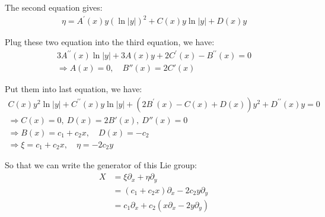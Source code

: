 \documentclass[]{ctexart}
\newcommand{\pa}{\partial}
\begin{document}
	The second equation gives:
		\begin{equation*}
		\begin{aligned}
			\eta=A^{\prime}(x) y(\ln |y|)^{2}+C(x) y \ln |y|+D(x) y
		\end{aligned}
		\end{equation*}
		
	Plug these two equation into the third equation, we have:
		\begin{equation*}
		\begin{array}{c}
			3 A^{\prime \prime}(x) \ln |y|+3 A(x) y+2 C^{\prime}(x)-B^{\prime \prime}(x)=0\\
			\Rightarrow	A(x)=0,\quad B''(x)=2C'(x)
		\end{array}
		\end{equation*}
		
	Put them into last equation, we have:
		\begin{equation*}
		\begin{array}{c}
			C(x) y^{2} \ln |y|+C^{\prime \prime}(x) y \ln |y|+\left(2 B^{\prime}(x)-C(x)+D(x)\right) y^{2}+D^{\prime \prime}(x) y=0\\
			\Rightarrow C(x)=0, ~D(x)=2B'(x),~ D''(x)=0\\
			\Rightarrow B(x)=c_1+c_2x,\quad D(x)=-c_2\\
			\Rightarrow \xi=c_1+c_2x, \quad \eta =-2c_2y
		\end{array}
		\end{equation*}
	
	So that we can write the generator of this Lie group:
		\begin{equation*}
		\begin{aligned}
			X&=\xi\pa_x+\eta\pa_y\\
			&=(c_1+c_2x)\pa_x-2c_2y\pa_y\\
			&=c_1\pa_x+c_2(x\pa_x-2y\pa_y)
		\end{aligned}
		\end{equation*}
		
\end{document}
